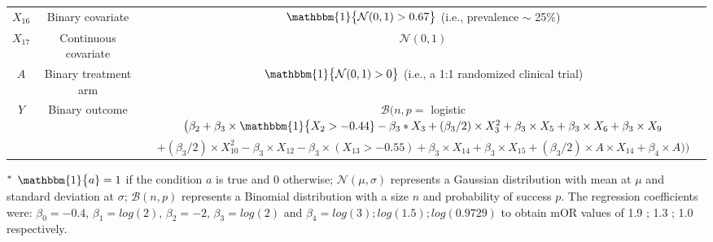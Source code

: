 \documentclass{article}
\begin{document}
\begin{center}
\begin{table}[!ht]
\begin{tabular*}{\textwidth}{@{\extracolsep\fill}ccc@{}}
$X_{16}$ & Binary  covariate &  $\mathbbm{1} \big \{ \mathcal{N} (0,1)> 0.67 \big \}$  (i.e., prevalence $\sim$ 25\%)  \\
$X_{17}$ & Continuous  covariate   &    $\mathcal{N} (0,1)$    \\ \hline
$A$ & Binary treatment arm   &   $\mathbbm{1} \big \{ \mathcal{N} (0,1)> 0 \big \}$  (i.e., a 1:1 randomized clinical trial)   \\ \hline
\multirow{2}{*}{$Y$} & \multirow{2}{*}{Binary  outcome} &   $\mathcal{B} \big ( n, p = $ logistic$ \big(  \beta_2 + \beta_3  \times \mathbbm{1} \big \{ X_{2} > -0.44  \}  -   \beta_3  * X_3 + ( \beta_3 / 2) \times X_3^2  + \beta_3 \times X_5 +  \beta_3 \times X_6 +  \beta_3 \times X_9$ \\
&  &  $ +   (\beta_3/2) \times X_{10}^2 -   \beta_3 \times X_{12} -  \beta_3 \times (X_{13} > -0.55) +  \beta_3 \times X_{14} +   \beta_3 \times X_{15} +   (\beta_3/2) \times  A \times X_{14} +   \beta_4 \times A    \big )  \big )$      \\ 
\bottomrule
\end{tabular*}
\begin{tablenotes}%
\item[$^{\rm *}$] $\mathbbm{1} \big \{  a \} = 1$ if the condition $a$ is true and 0 otherwise;  $\mathcal{N} (\mu,\sigma)$ represents a Gaussian distribution with mean at $\mu$ and standard deviation at $\sigma$; $\mathcal{B} (n,p)$ represents a Binomial distribution with a size $n$ and probability of success  $p$.  The regression coefficients were: $\beta_0 = -0.4 $,   $\beta_1 = log(2)$,  $\beta_2 = -2$,  $\beta_3 = log(2)$ and $\beta_4 = log(3) ; log(1.5) ; log(0.9729)$ to obtain mOR values of 1.9 ; 1.3 ; 1.0 respectively.
\end{tablenotes}
\end{table}
\end{center}
\end{document}
